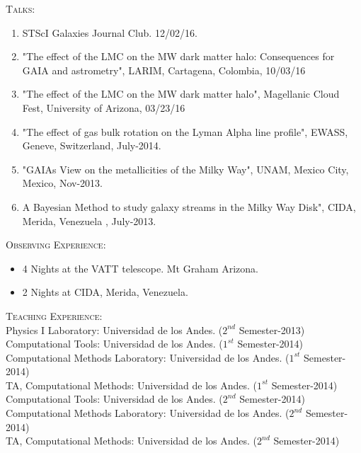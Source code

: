 \documentclass[letterpaper]{article}
\begin{document}
\textsc{\Large Talks:}\\
\begin{enumerate}
\setlength\itemsep{0em}
\item STScI Galaxies Journal Club. 12/02/16.\\
\item "The effect of the LMC on the MW dark matter halo:
Consequences for GAIA and astrometry", LARIM, Cartagena, Colombia,
10/03/16
\item "The effect of the LMC on the MW dark matter halo", Magellanic Cloud Fest, 
University of Arizona, 03/23/16\\
\item "The effect of gas bulk rotation on the Lyman Alpha line profile", EWASS, Geneve, Switzerland, July-2014.\\
\item "GAIAs View on the metallicities of the Milky Way", UNAM, Mexico City, Mexico, Nov-2013. \\
\item A Bayesian Method to study galaxy streams in the Milky Way Disk", CIDA, Merida, Venezuela , July-2013.\\
\end{enumerate}

\textsc{\Large Observing Experience:}\\
\begin{itemize}
\item{4 Nights at the VATT telescope. Mt Graham Arizona.}
\item{2 Nights at CIDA, Merida, Venezuela.}
\end{itemize}


\textsc{\Large Teaching Experience:}\\

Physics I Laboratory: Universidad de los Andes. \indent ($2^{nd}$
Semester-2013)\\
\indent Computational Tools: Universidad de los Andes. \indent
($1^{st}$ Semester-2014)\\
\indent Computational Methods Laboratory: Universidad de los Andes.
\indent ($1^{st}$ Semester-2014)\\
\indent TA, Computational Methods: Universidad de los Andes. \indent
($1^{st}$ Semester-2014)\\
\indent Computational Tools: Universidad de los Andes. \indent
($2^{nd}$ Semester-2014)\\
\indent Computational Methods Laboratory: Universidad de los Andes.
\indent ($2^{nd}$ Semester-2014)\\
\indent TA, Computational Methods: Universidad de los Andes. \indent
($2^{nd}$ Semester-2014)\\
\end{document}
